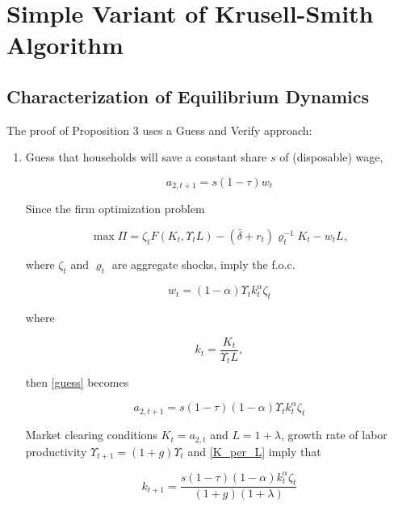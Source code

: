\documentclass[12pt,a4paper]{article}
\begin{document}
\newpage

\section{Simple Variant of Krusell-Smith Algorithm}

\subsection{Characterization of Equilibrium Dynamics}

The proof of Proposition 3 uses a Guess and Verify approach:

\begin{enumerate}

  \item Guess that households will save a constant share $s$ of (disposable) wage,

    \begin{equation}
      a_{2,t+1} = s(1-\tau)w_t
    \label{guess}
    \end{equation}

  Since the firm optimization problem

    \[
      \max \Pi = \zeta_t F(K_t, \Upsilon_t L) - (\bar{\delta} + r_t)\varrho_t^{-1} K_t - w_t L,
    \]

  where $\zeta_t$ and $\varrho_t$ are aggregate shocks, imply the f.o.c.

    \[
      w_{t} = (1-\alpha)\Upsilon_t k_t^\alpha \zeta_t
    \]

  where

    \begin{equation}
        k_t = \frac{K_t}{\Upsilon_t L},
        \label{K_per_L}
    \end{equation}

  then \ref{guess} becomes

    \begin{equation}
        a_{2,t+1} = s(1-\tau)(1-\alpha)\Upsilon_t k_t^\alpha \zeta_t
    \label{a_guess}
    \end{equation}

  Market clearing conditions $K_t = a_{2,t}$ and $L = 1 + \lambda$, growth rate of labor productivity $\Upsilon_{t+1} = (1+g)\Upsilon_{t}$  and \ref{K_per_L} imply that

    \begin{equation}
        k_{t+1} = \frac{s(1-\tau)(1-\alpha) k_t^\alpha \zeta_t}{(1 + g)(1 + \lambda)}
        \label{K_guess}
    \end{equation}


\end{enumerate}
\end{document}
